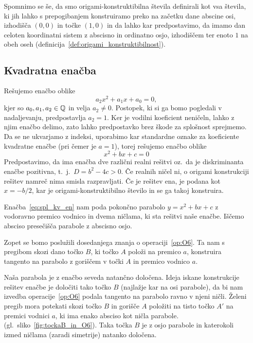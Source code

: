 Spomnimo se še, da smo origami-konstruktibilna števila definirali kot vsa števila, ki jih lahko s prepogibanjem konstruiramo preko na začetku dane abscine osi, izhodišča $(0,0)$ in točke $(1,0)$ in da lahko kar predpostavimo, da imamo dan celoten koordinatni sistem z abscisno in ordinatno osjo, izhodiščem ter enoto $1$ na obeh oseh (definicija~\ref{def:origami_konstruktibilnost}). 

\subsection{Kvadratna enačba}

Rešujemo enačbo oblike
$$ a_2 x^2 + a_1 x + a_0 = 0, $$
kjer so $a_0, a_1, a_2 \in \mathbb Q$ in velja $a_2 \ne 0$. Postopek, ki si ga bomo pogledali v nadaljevanju, predpostavlja $a_2 = 1$. Ker je vodilni koeficient neničeln, lahko z njim enačbo delimo, zato lahko predpostavko brez škode za splošnost sprejmemo. Da se ne ukvarjamo z indeksi, uporabimo kar standardne oznake za koeficiente kvadratne enačbe (pri čemer je $a = 1$), torej rešujemo enačbo oblike
\begin{equation}
    \label{eq:spl_kv_en}
    x^2 + bx + c = 0
\end{equation}
Predpostavimo, da ima enačba dve različni realni rešitvi oz.\ da je diskriminanta enačbe pozitivna, t.\ j.\ $D = b^2 - 4c > 0$. Če realnih ničel ni, o origami konstrukciji rešitev namreč nima smisla razpravljati. Če je rešitev ena, je podana kot $x = -b/2$, kar je origami-konstruktibilno število in se ga takoj konstruira.

Enačba~\ref{eq:spl_kv_en} nam poda pokončno parabolo $y = x^2 + bx + c$ z vodoravno premico vodnico in dvema ničlama, ki sta rešitvi naše enačbe. Iščemo absciso presečišča parabole z abscisno osjo.

Zopet se bomo poslužili dosedanjega znanja o operaciji~\ref{op:O6}. Ta nam s pregibom skozi dano točko $B$, ki točko $A$ položi na premico $a$, konstruira tangento na parabolo z goriščem v točki $A$ in premico vodnico $a$.

Naša parabola je z enačbo seveda natančno določena. Ideja iskane konstrukcije rešitev enačbe je določiti tako točko $B$ (najlažje kar na osi parabole), da bi nam izvedba operacije~\ref{op:O6} podala tangento na parabolo ravno v njeni ničli. Želeni pregib mora potekati skozi točko $B$ in gorišče $A$ položiti na tisto točko $A'$ na premici vodnici $a$, ki ima enako absciso kot ničla parabole. (gl.\ sliko~\ref{fig:tockaB_in_O6}). Taka točka $B$ je z osjo parabole in katerokoli izmed ničlama (zaradi simetrije) natanko določena.


